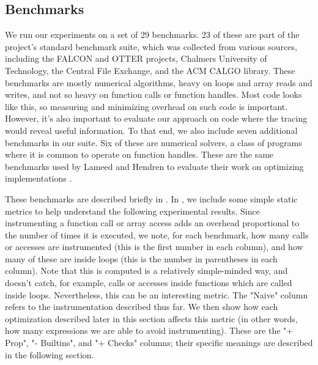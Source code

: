 \subsection{Benchmarks}

We run our experiments on a set of 29 \matlab benchmarks. 23 of these are part
of the \mclab project's standard benchmark suite, which was collected from
various sources, including the FALCON and OTTER projects, Chalmers University
of Technology, the \matlab Central File Exchange, and the ACM CALGO library.
These benchmarks are mostly numerical algorithms, heavy on loops and array
reads and writes, and not so heavy on function calls or function handles. Most
\matlab code looks like this, so measuring and minimizing overhead on such code
is important. However, it's also important to evaluate our approach on code
where the tracing would reveal useful information. To that end, we also include
seven additional benchmarks in our suite. Six of these are numerical solvers, a
class of programs where it is common to operate on function handles. These are
the same benchmarks used by Lameed and Hendren to evaluate their work on
optimizing  implementations \cite{OptimizingFeval}.

These benchmarks are described briefly in
. In
, we include some simple
static metrics to help understand the following experimental results. Since
instrumenting a function call or array access adds an overhead proportional to
the number of times it is executed, we note, for each benchmark, how many calls
or accesses are instrumented (this is the first number in each column), and how
many of these are inside loops (this is the number in parentheses in each
column). Note that this is computed is a relatively simple-minded way, and
doesn't catch, for example, calls or accesses inside functions which are called
inside loops. Nevertheless, this can be an interesting metric. The "Naive"
column refers to the instrumentation described thus far. We then show how each
optimization described later in this section affects this metric (in other
words, how many expressions we are able to avoid instrumenting). These are the
"+ Prop", "- Builtins", and "+ Checks" columns; their specific meanings are
described in the following section.

